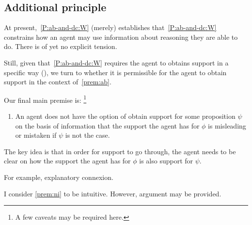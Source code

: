 \documentclass[10pt]{article}
\begin{document}
\subsection{Additional principle}
\label{sec:additional-principle}

\begin{note}
  At present,~\ref{P:ab-and-dc:W} (merely) establishes that~\ref{P:ab-and-dc:W} constrains how an agent may use information about reasoning they are able to do.
  There is of yet no explicit tension.

  Still, given that~\ref{P:ab-and-dc:W} requires the agent to obtains support in a specific way (\AR{}), we turn to whether it is permissible for the agent to obtain support in the context of~\ref{prem:ab}.
\end{note}

\begin{note}[Inertia]
  Our final main premise is:\nolinebreak
  \footnote{
    A few caveats may be required here.
  }
  \begin{enumerate}[label=\nI{}, ref=\nI{}]
  \item\label{prem:ni} An agent does not have the option of obtain support for some proposition \(\psi\) on the basis of information that the support the agent has for \(\phi\) is misleading or mistaken if \(\psi\) is not the case.
  \end{enumerate}

  The key idea is that in order for support to go through, the agent needs to be clear on how the support the agent has for \(\phi\) is also support for \(\psi\).

  For example, explanatory connexion.


  I consider \ref{prem:ni} to be intuitive.
  However, argument may be provided.
\end{note}
\end{document}
